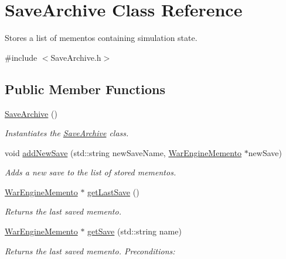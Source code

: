 \hypertarget{classSaveArchive}{}\section{Save\+Archive Class Reference}
\label{classSaveArchive}


Stores a list of mementos containing simulation state.  




{\ttfamily \#include $<$Save\+Archive.\+h$>$}

\subsection*{Public Member Functions}
\begin{DoxyCompactItemize}
\item 
\mbox{\label{classSaveArchive_a676252cf830fbe7b2a2b37ce2371a859}} 
\hyperlink{classSaveArchive_a676252cf830fbe7b2a2b37ce2371a859}{Save\+Archive} ()
\begin{DoxyCompactList}\small\item\em Instantiates the \hyperlink{classSaveArchive}{Save\+Archive} class. \end{DoxyCompactList}\item 
void \hyperlink{classSaveArchive_ab6927785f5b7f07b079a424773796d49}{add\+New\+Save} (std\+::string new\+Save\+Name, \hyperlink{classWarEngineMemento}{War\+Engine\+Memento} $\ast$new\+Save)
\begin{DoxyCompactList}\small\item\em Adds a new save to the list of stored mementos. \end{DoxyCompactList}\item 
\hyperlink{classWarEngineMemento}{War\+Engine\+Memento} $\ast$ \hyperlink{classSaveArchive_a144c8a27272d190164ad1f0e9dbdcc01}{get\+Last\+Save} ()
\begin{DoxyCompactList}\small\item\em Returns the last saved memento. \end{DoxyCompactList}\item 
\hyperlink{classWarEngineMemento}{War\+Engine\+Memento} $\ast$ \hyperlink{classSaveArchive_ad65ce77b8a9027b4e4a5d67ca1f06877}{get\+Save} (std\+::string name)
\begin{DoxyCompactList}\small\item\em Returns the last saved memento. Preconditions\+: \end{DoxyCompactList}\item 

\end{DoxyCompactItemize}
